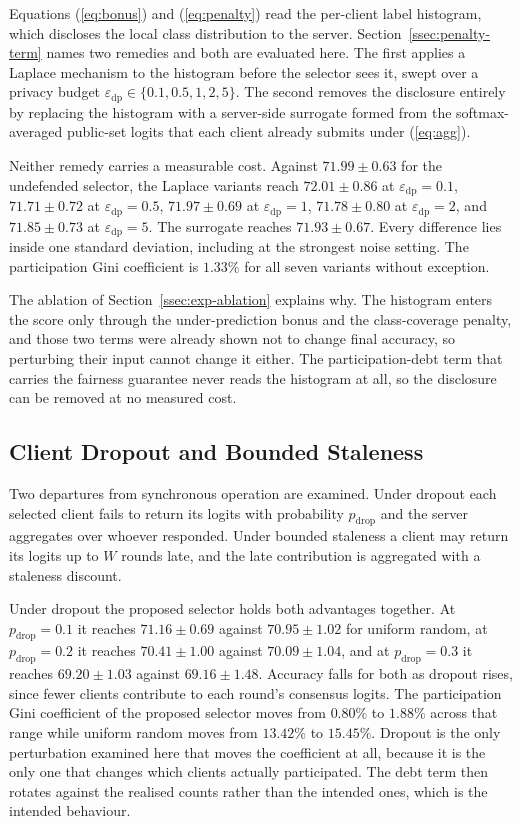 \documentclass[journal]{IEEEtran}
\newcommand{\rev}[1]{{\color{blue}#1}}
\begin{document}
\rev{Equations (\ref{eq:bonus}) and (\ref{eq:penalty}) read the per-client label histogram, which discloses the local class distribution to the server. Section~\ref{ssec:penalty-term} names two remedies and both are evaluated here. The first applies a Laplace mechanism to the histogram before the selector sees it, swept over a privacy budget $\varepsilon_{\mathrm{dp}} \in \{0.1, 0.5, 1, 2, 5\}$. The second removes the disclosure entirely by replacing the histogram with a server-side surrogate formed from the softmax-averaged public-set logits that each client already submits under (\ref{eq:agg}).}

\rev{Neither remedy carries a measurable cost. Against $71.99 \pm 0.63$ for the undefended selector, the Laplace variants reach $72.01 \pm 0.86$ at $\varepsilon_{\mathrm{dp}} = 0.1$, $71.71 \pm 0.72$ at $\varepsilon_{\mathrm{dp}} = 0.5$, $71.97 \pm 0.69$ at $\varepsilon_{\mathrm{dp}} = 1$, $71.78 \pm 0.80$ at $\varepsilon_{\mathrm{dp}} = 2$, and $71.85 \pm 0.73$ at $\varepsilon_{\mathrm{dp}} = 5$. The surrogate reaches $71.93 \pm 0.67$. Every difference lies inside one standard deviation, including at the strongest noise setting. The participation Gini coefficient is $1.33\%$ for all seven variants without exception.}

\rev{The ablation of Section~\ref{ssec:exp-ablation} explains why. The histogram enters the score only through the under-prediction bonus and the class-coverage penalty, and those two terms were already shown not to change final accuracy, so perturbing their input cannot change it either. The participation-debt term that carries the fairness guarantee never reads the histogram at all, so the disclosure can be removed at no measured cost.}

\subsection{Client Dropout and Bounded Staleness}
\label{ssec:exp-dropout}

\rev{Two departures from synchronous operation are examined. Under dropout each selected client fails to return its logits with probability $p_{\text{drop}}$ and the server aggregates over whoever responded. Under bounded staleness a client may return its logits up to $W$ rounds late, and the late contribution is aggregated with a staleness discount.}

\rev{Under dropout the proposed selector holds both advantages together. At $p_{\text{drop}} = 0.1$ it reaches $71.16 \pm 0.69$ against $70.95 \pm 1.02$ for uniform random, at $p_{\text{drop}} = 0.2$ it reaches $70.41 \pm 1.00$ against $70.09 \pm 1.04$, and at $p_{\text{drop}} = 0.3$ it reaches $69.20 \pm 1.03$ against $69.16 \pm 1.48$. Accuracy falls for both as dropout rises, since fewer clients contribute to each round's consensus logits. The participation Gini coefficient of the proposed selector moves from $0.80\%$ to $1.88\%$ across that range while uniform random moves from $13.42\%$ to $15.45\%$. Dropout is the only perturbation examined here that moves the coefficient at all, because it is the only one that changes which clients actually participated. The debt term then rotates against the realised counts rather than the intended ones, which is the intended behaviour.}
\end{document}
